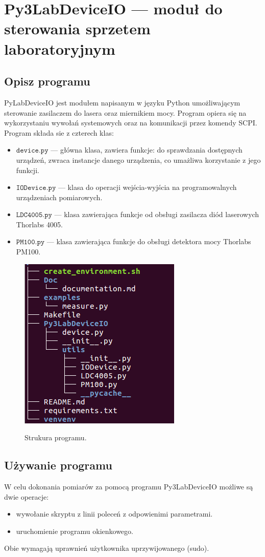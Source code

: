 \documentclass[a4paper, portrait,12pt]{report}
\begin{document}
\newpage

\chapter{Py3LabDeviceIO --- moduł do sterowania sprzetem laboratoryjnym}
\section{Opisz programu}
PyLabDeviceIO jest modułem napisanym w języku Python umożliwającym sterowanie zasilaczem do lasera oraz miernikiem mocy. Program opiera się na wykorzystaniu wywołań systemowych oraz na komunikacji przez komendy SCPI. \\

Program składa sie z czterech klas:
\begin{itemize}
\item $\mathtt{device.py}$ --- główna klasa, zawiera funkcje: do sprawdzania dostępnych urządzeń, 
zwraca instancje danego urządzenia, co umażliwa korzystanie z jego funkcji. 
\item $\mathtt{IODevice.py}$ --- klasa do operacji wejścia-wyjścia na programowalnych urządzeniach pomiarowych.
\item $\mathtt{LDC4005.py}$ --- klasa zawierająca funkcje od obsługi zasilacza diód laserowych Thorlabs 4005.
\item $\mathtt{PM100.py}$ --- klasa zawierająca funkcje do obsługi detektora mocy Thorlabs PM100.
\end{itemize}
\begin{figure}[h]
\center
  \includegraphics[scale=0.45]{tree.png}
  \label{rys1}
  \caption{Strukura programu.} 
\end{figure}
\section{Używanie programu}
W celu dokonania pomiarów za pomocą programu Py3LabDeviceIO możliwe są dwie operacje:
\begin{itemize}
\item wywołanie skryptu z linii poleceń z odpowienimi parametrami.
\item uruchomienie programu okienkowego.
\end{itemize}
Obie wymagają uprawnień użytkownika uprzywijowanego (sudo).
\newpage
\end{document}
